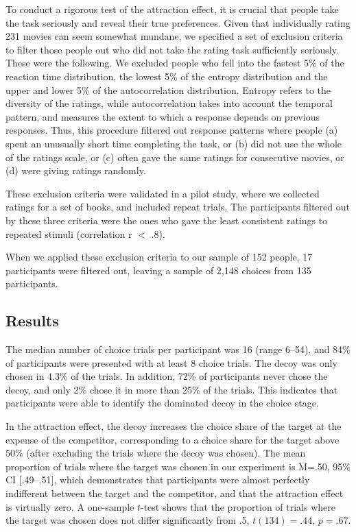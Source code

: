 \documentclass[12pt, a4paper]{article}
\begin{document}
To conduct a rigorous test of the attraction effect, it is crucial that people take the task seriously and reveal their true preferences. Given that individually rating 231 movies can seem somewhat mundane, we specified a set of exclusion criteria to filter those people out who did not take the rating task sufficiently seriously. These were the following. We excluded people who fell into the fastest 5\% of the reaction time distribution, the lowest 5\% of the entropy distribution and the upper and lower 5\% of the autocorrelation distribution. Entropy refers to the diversity of the ratings, while autocorrelation takes into account the temporal pattern, and measures the extent to which a response depends on previous responses. Thus, this procedure filtered out response patterns where people (a) spent an unusually short time completing the task, or (b) did not use the whole of the ratings scale, or (c) often gave the same ratings for consecutive movies, or (d) were giving ratings randomly.

These exclusion criteria were validated in a pilot study, where we collected ratings for a set of books, and included repeat trials. The participants filtered out by these three criteria were the ones who gave the least consistent ratings to repeated stimuli (correlation r $<$ .8).

When we applied these exclusion criteria to our sample of 152 people, 17 participants were filtered out, leaving a sample of 2,148 choices from 135 participants.


\subsection*{Results}

The median number of choice trials per participant was 16 (range 6--54), and 84\% of participants were presented with at least 8 choice trials. The decoy was only chosen in 4.3\% of the trials. In addition, 72\% of participants never chose the decoy, and only 2\% chose it in more than 25\% of the trials. This indicates that participants were able to identify the dominated decoy in the choice stage.

In the attraction effect, the decoy increases the choice share of the target at the expense of the competitor, corresponding to a choice share for the target above 50\% (after excluding the trials where the decoy was chosen). The mean proportion of trials where the target was chosen in our experiment is M=.50, 95\% CI [.49--.51], which demonstrates that participants were almost perfectly indifferent between the target and the competitor, and that the attraction effect is virtually zero. A one-sample $t$-test shows that the proportion of trials where the target was chosen does not differ significantly from .5, $t(134)=.44$, $p=.67$.
\end{document}
